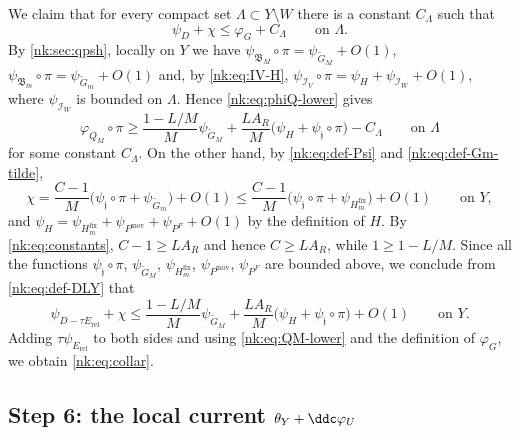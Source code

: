 We claim that for every compact set $\Lambda\subset Y\setminus W$
there is a constant $C_\Lambda$ such that
\begin{equation}\label{nk:eq:collar}
  \psi_D+\chi\le\varphi_G+C_\Lambda\qquad\text{on }\Lambda.
\end{equation}
By \cref{nk:sec:qpsh}, locally on $Y$ we have
$\psi_{\mathfrak B_M}\circ\pi=\psi_{\widetilde G_M}+O(1)$,
$\psi_{\mathfrak B_m}\circ\pi=\psi_{\widetilde G_m}+O(1)$ and, by
\eqref{nk:eq:IV-H},
$\psi_{\mathcal I_V}\circ\pi=\psi_H+\psi_{\mathcal I_W}+O(1)$, where
$\psi_{\mathcal I_W}$ is bounded on $\Lambda$. Hence \eqref{nk:eq:phiQ-lower} gives
\begin{equation}\label{nk:eq:QM-lower}
  \varphi_{Q_M}\circ\pi\ge\frac{1-L/M}M\psi_{\widetilde G_M}
   +\frac{LA_R}M\bigl(\psi_H+\psi_{\mathfrak j}\circ\pi\bigr)-C_\Lambda
  \qquad\text{on }\Lambda
\end{equation}
for some constant $C_\Lambda$. On the other hand, by \eqref{nk:eq:def-Psi} and
\eqref{nk:eq:def-Gm-tilde},
\[
  \chi=\frac{C-1}M\bigl(\psi_{\mathfrak j}\circ\pi+\psi_{\widetilde G_m}\bigr)+O(1)
  \le\frac{C-1}M\bigl(\psi_{\mathfrak j}\circ\pi+\psi_{H^{{\mathrm{fix}}}_m}\bigr)+O(1)
  \qquad\text{on }Y,
\]
and $\psi_H=\psi_{H^{{\mathrm{fix}}}_m}+\psi_{P^{{\mathrm{mov}}}}+\psi_{P^F}+O(1)$ by
the definition of $H$. By \eqref{nk:eq:constants},
$C-1\ge LA_R$ and hence $C\ge LA_R$, while $1\ge1-L/M$. Since all
the functions
$\psi_{\mathfrak j}\circ\pi$,
$\psi_{\widetilde G_M}$, $\psi_{H^{{\mathrm{fix}}}_m}$, $\psi_{P^{{\mathrm{mov}}}}$,
$\psi_{P^F}$ are bounded above, we conclude from \eqref{nk:eq:def-DLY} that
\[
  \psi_{D-\tau E_{{\mathrm{rel}}}}+\chi
  \le\frac{1-L/M}M\psi_{\widetilde G_M}
   +\frac{LA_R}M\bigl(\psi_H+\psi_{\mathfrak j}\circ\pi\bigr)+O(1)
  \qquad\text{on }Y.
\]
Adding $\tau\psi_{E_{{\mathrm{rel}}}}$ to both sides and using
\eqref{nk:eq:QM-lower} and the definition of $\varphi_G$, we obtain
\eqref{nk:eq:collar}.

\subsection*{Step 6: the local current \texorpdfstring{$\theta_Y+\ddc\varphi_U$}{near W}}


